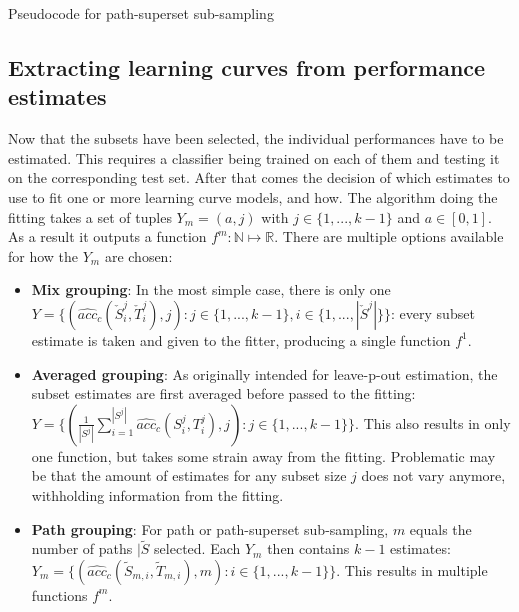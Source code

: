 \begin{algorithm}[h]
	\begin{algorithmic}[1]
		\State {}
		\State {}
		\EndFor
		\State {}
		\EndFor
	\end{algorithmic}
	\caption{Pseudocode for path-superset sub-sampling}
	\label{alg:resPathSubSampling}
\end{algorithm}

\subsection{Extracting learning curves from performance estimates}
Now that the subsets have been selected, the individual performances have to be estimated. This requires a classifier being trained on each of them and testing it on the corresponding test set. After that comes the decision of which estimates to use to fit one or more learning curve models, and how. The algorithm doing the fitting takes a set of tuples $Y_m = {(a,j)}$ with $j \in \{1,...,k-1\}$ and $a \in [0,1]$. As a result it outputs a function $f^m: \mathbb{N} \mapsto \mathbb{R}$. There are multiple options available for how the $Y_m$ are chosen:
\begin{itemize}
	\item \textbf{Mix grouping}: In the most simple case, there is only one $Y = \{(\widehat{acc}_c(\check{S}^j_i, \check{T}^j_i), j): j\in\{1,...,k-1\}, i\in\{1,...,|\check{S}^j|\}\}$: every subset estimate is taken and given to the fitter, producing a single function $f^1$.
	\item \textbf{Averaged grouping}: As originally intended for leave-p-out estimation, the subset estimates are first averaged before passed to the fitting:\\$Y = \{(\frac{1}{|S^j|} \sum_{i=1}^{|S^j|} \widehat{acc}_c(S^j_i, T^j_i), j): j \in \{1,...,k-1\}\}$. This also results in only one function, but takes some strain away from the fitting. Problematic may be that the amount of estimates for any subset size $j$ does not vary anymore, withholding information from the fitting.
	\item \textbf{Path grouping}: For path or path-superset sub-sampling, $m$ equals the number of paths $|\tilde{S}$ selected. Each $Y_m$ then contains $k-1$ estimates: $Y_m = \{(\widehat{acc}_c(\tilde{S}_{m,i}, \tilde{T}_{m,i}), m): i \in \{1,...,k-1\}\}$. This results in multiple functions $f^m$.
\end{itemize}

